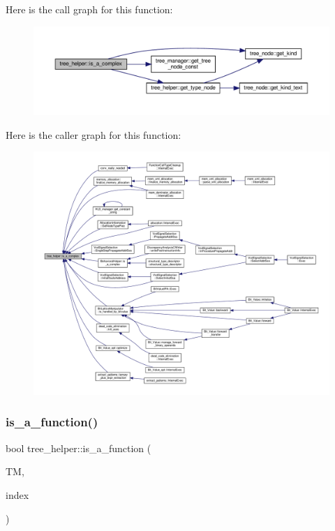 Here is the call graph for this function\+:
\nopagebreak
\begin{figure}[H]
\begin{center}
\leavevmode
\includegraphics[width=350pt]{d7/d99/classtree__helper_af7b886ed7c1bbaa4149b536830c5d16d_cgraph}
\end{center}
\end{figure}
Here is the caller graph for this function\+:
\nopagebreak
\begin{figure}[H]
\begin{center}
\leavevmode
\includegraphics[width=350pt]{d7/d99/classtree__helper_af7b886ed7c1bbaa4149b536830c5d16d_icgraph}
\end{center}
\end{figure}
\mbox{\label{classtree__helper_aa6612c96f6dd64598da3311387939635}} 
\subsubsection{\texorpdfstring{is\+\_\+a\+\_\+function()}{is\_a\_function()}}
{\footnotesize\ttfamily bool tree\+\_\+helper\+::is\+\_\+a\+\_\+function (\begin{DoxyParamCaption}\item[{const \hyperlink{tree__manager_8hpp_a792e3f1f892d7d997a8d8a4a12e39346}{tree\+\_\+manager\+Const\+Ref} \&}]{TM,  }\item[{const unsigned int}]{index }\end{DoxyParamCaption})\hspace{0.3cm}{\ttfamily [static]}}



